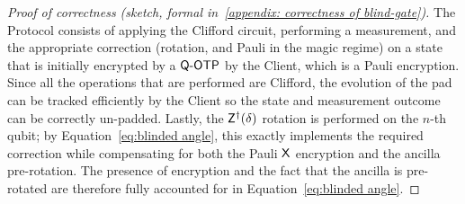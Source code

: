 \begin{proof}[Proof of correctness (sketch, formal in~\ref{appendix: correctness of blind-gate})]
    The Protocol consists of applying the Clifford circuit, performing a measurement, and the appropriate correction (rotation, and Pauli in the magic regime) on a state that is initially encrypted by a $\textsf{Q-OTP}$ by the Client, which is a Pauli encryption. Since all the operations that are performed are Clifford, the evolution of the pad can be tracked efficiently by the Client so the state and measurement outcome can be correctly un-padded. Lastly, the $\mathsf{Z}^\dagger(\delta)$ rotation is performed on the $n$-th qubit; by Equation~\ref{eq:blinded angle}, this exactly implements the required correction while compensating for both the Pauli $\mathsf{X}$ encryption and the ancilla pre-rotation. The presence of encryption and the fact that the ancilla is pre-rotated are therefore fully accounted for in Equation~\ref{eq:blinded angle}.
\end{proof}

